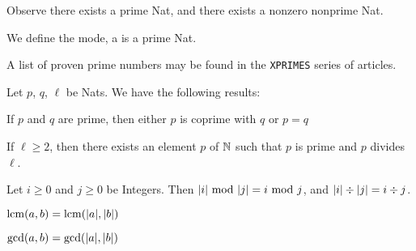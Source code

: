 \documentclass{article}
\begin{document}
Observe there exists a prime Nat, and there exists a nonzero nonprime
Nat.

\begin{definition}
We define the mode, a  is a prime Nat.
\end{definition}

\begin{remark}
A list of proven prime numbers may be found in the \texttt{XPRIMES}
series of articles.
\end{remark}

Let $p$, $q$, $\ell$ be Nats.
We have the following results:
\begin{thm}
\item\label{int2:30} If $p$ and $q$ are prime, then either $p$ is
  coprime with $q$ or $p=q$
\item\label{int2:31} If $\ell\geq2$, then there exists an element $p$ of
  $\mathbb{N}$ such that $p$ is prime and $p$ divides $\ell$.
\item\label{int2:32} Let $i\geq0$ and $j\geq0$ be Integers.
  Then $\abs{i}\mod{\abs{j}}=i\mod{j}$, and $\lvert i\rvert\div\lvert j\rvert=i\div j$.
\item\label{int2:33} $\operatorname{lcm}(a,b)=\operatorname{lcm}(\lvert a\rvert,\lvert b\rvert)$
\item\label{int2:34} $\gcd(a,b)=\gcd(\lvert a\rvert,\lvert b\rvert)$
\end{thm}
\end{document}
